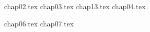 {chap02.tex}
\clearemptydoublepage
%
{chap03.tex}
\clearemptydoublepage
{chap13.tex}
\clearemptydoublepage
{chap04.tex}
\clearemptydoublepage

{chap06.tex}
\clearemptydoublepage
{chap07.tex}
%
%
%
\backmatter
%

\clearemptydoublepage
%
%   
\listofchanges
